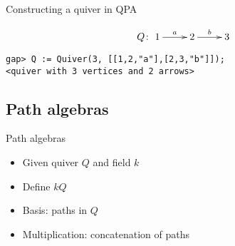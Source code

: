 \begin{frame}[fragile]{Constructing a quiver in QPA}

{\Large
\[
Q \colon \xymatrix{1\ar[r]^a & 2\ar[r]^b & 3}
\]
}
\begin{verbatim}
gap> Q := Quiver(3, [[1,2,"a"],[2,3,"b"]]); 
<quiver with 3 vertices and 2 arrows>
\end{verbatim}
\end{frame}



\subsection{Path algebras}

\begin{frame}{Path algebras}

\begin{itemize}
\item Given quiver $Q$ and field $k$
\item Define  $kQ$
\item Basis: paths in $Q$
\item Multiplication: concatenation of paths
\end{itemize}
\end{frame}

